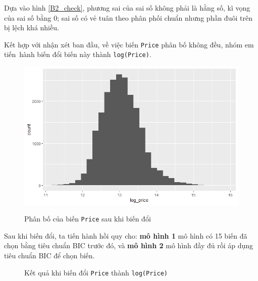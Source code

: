  Dựa vào hình \ref{B2_check}, phương sai của sai số không phải là hằng số, kì vọng của sai số bằng 0; sai số có vẻ tuân theo phân phối chuẩn nhưng phần đuôi trên bị lệch khá nhiều. 
 
 Kết hợp với nhận xét ban đầu, về việc biến \texttt{Price} phân bố không đều, nhóm em tiến~hành biến đổi biến này thành \texttt{log(Price)}.
 
 \begin{figure}[H]
 	\centering
 	{\includegraphics[width=.5\linewidth]{../Photo Of Result/B2_logprice}}
 	\caption{Phân bố của biến \texttt{Price} sau khi biến đổi }
 	\label{B2_log}
 \end{figure}
 Sau khi biến đổi, ta tiến hành hồi quy cho: \textbf{mô hình 1} mô hình có 15 biến đã chọn bằng tiêu chuẩn BIC trước đó, và \textbf{mô hình 2} mô hình đầy đủ rồi áp dụng tiêu chuẩn BIC để chọn biến.
 
  \begin{figure}[H]
 	\centering
 	\hfill
 	\caption{Kết quả khi biến đổi \texttt{Price} thành \texttt{log(Price)}}
 \end{figure}
 

